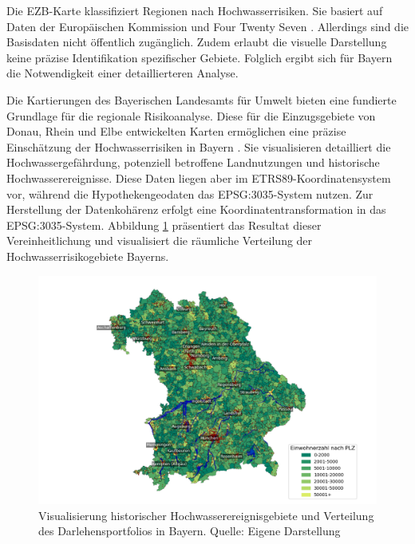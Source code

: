 Die \ac{EZB}-Karte klassifiziert Regionen nach Hochwasserrisiken. Sie basiert auf Daten der Europäischen Kommission und Four Twenty Seven \parencite{ECB2022ClimateStressTest}. Allerdings sind die Basisdaten nicht öffentlich zugänglich. Zudem erlaubt die visuelle Darstellung keine präzise Identifikation spezifischer Gebiete. Folglich ergibt sich für Bayern die Notwendigkeit einer detaillierteren Analyse.

Die Kartierungen des Bayerischen Landesamts für Umwelt bieten eine fundierte Grundlage für die regionale Risikoanalyse. Diese für die Einzugsgebiete von Donau, Rhein und Elbe entwickelten Karten ermöglichen eine präzise Einschätzung der Hochwasserrisiken in Bayern \parencite{LfU_Bayern}. Sie visualisieren detailliert die Hochwassergefährdung, potenziell betroffene Landnutzungen und historische Hochwasserereignisse.
Diese Daten liegen aber im ETRS89-Koordinatensystem vor, während die Hypothekengeodaten das EPSG:3035-System nutzen. Zur Herstellung der Datenkohärenz erfolgt eine Koordinatentransformation in das EPSG:3035-System. Abbildung \ref{fig:bayernflut} präsentiert das Resultat dieser Vereinheitlichung und visualisiert die räumliche Verteilung der Hochwasserrisikogebiete Bayerns.
\begin{figure}[htbp]
    \centering
    \includegraphics[width=\textwidth]{figures/bayern_flut.png} 
    \caption{Visualisierung historischer Hochwasserereignisgebiete und Verteilung des Darlehensportfolios in Bayern. Quelle: Eigene Darstellung}
    \label{fig:bayernflut}
\end{figure}
\FloatBarrier


